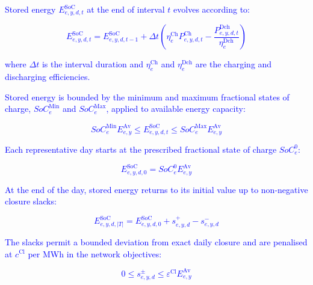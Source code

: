 \documentclass[preprint,12pt]{elsarticle}
\begin{document}
\textcolor{blue}{
    Stored energy $E^{\text{SoC}}_{e,y,d,t}$ at the end of interval $t$ evolves according to:
}

\textcolor{blue}{
    \begin{equation}
        E^{\text{SoC}}_{e,y,d,t} = E^{\text{SoC}}_{e,y,d,t-1}
        + \Delta t \left( \eta^{\text{Ch}}_e P^{\text{Ch}}_{e,y,d,t} - \frac{P^{\text{Dch}}_{e,y,d,t}}{\eta^{\text{Dch}}_e} \right)
        \label{eq:soc_recursion}
    \end{equation}
}

\noindent
\textcolor{blue}{
    where $\Delta t$ is the interval duration and $\eta^{\text{Ch}}_e$ and $\eta^{\text{Dch}}_e$ are the charging and discharging efficiencies.
}

\textcolor{blue}{
    Stored energy is bounded by the minimum and maximum fractional states of charge, $SoC^{\text{Min}}_e$ and $SoC^{\text{Max}}_e$, applied to available energy capacity:
}

\textcolor{blue}{
    \begin{equation}
        SoC^{\text{Min}}_e E^{\text{Av}}_{e,y}
        \le E^{\text{SoC}}_{e,y,d,t}
        \le SoC^{\text{Max}}_e E^{\text{Av}}_{e,y}
        \label{eq:soc_limits}
    \end{equation}
}

\textcolor{blue}{
    Each representative day starts at the prescribed fractional state of charge $SoC^0_e$:
}

\textcolor{blue}{
    \begin{equation}
        E^{\text{SoC}}_{e,y,d,0}
        =
        SoC^0_e E^{\text{Av}}_{e,y}
        \label{eq:soc_initial}
    \end{equation}
}

\textcolor{blue}{
    At the end of the day, stored energy returns to its initial value up to non-negative closure slacks:
}

\textcolor{blue}{
    \begin{equation}
        E^{\text{SoC}}_{e,y,d,|T|}
        =
        E^{\text{SoC}}_{e,y,d,0}
        + s^+_{e,y,d} - s^-_{e,y,d}
        \label{eq:soc_closure}
    \end{equation}
}

\textcolor{blue}{
    The slacks permit a bounded deviation from exact daily closure and are penalised at $c^{\text{Cl}}$ per MWh in the network objectives:
}

\textcolor{blue}{
    \begin{equation}
        0 \le s^\pm_{e,y,d}
        \le \varepsilon^{\text{Cl}} E^{\text{Av}}_{e,y}
        \label{eq:soc_closure_slack}
    \end{equation}
}
\end{document}
